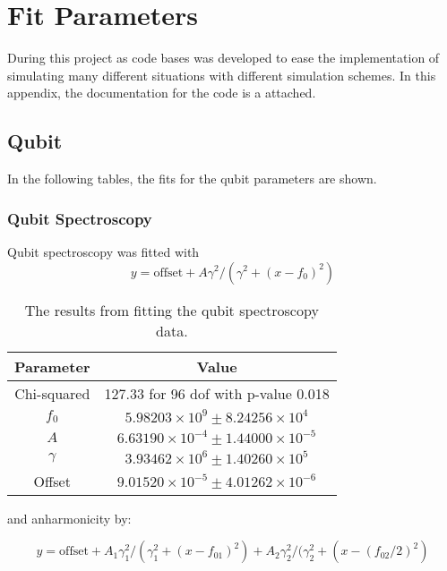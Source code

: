 \chapter{Fit Parameters}\label{chap:fit_params}
During this project as code bases was developed to ease the implementation of simulating many different situations with different simulation schemes. In this appendix, the documentation for the code is a attached.


\section{Qubit}
In the following tables, the fits for the qubit parameters are shown.
\subsection{Qubit Spectroscopy}
Qubit spectroscopy was fitted with 
\begin{equation}
    y = \text{offset} + A\gamma^2/(\gamma^2 + (x - f_0)^2)
\end{equation}
\begin{table}[h]
\centering
\begin{tabular}{|c|c|}
\hline
Parameter & Value \\
\hline
Chi-squared & 127.33 for 96 dof with p-value 0.018 \\
$f_0$ & $5.98203 \times 10^9 \pm 8.24256 \times 10^4$ \\
$A$ & $6.63190 \times 10^{-4} \pm 1.44000 \times 10^{-5}$ \\
$\gamma$ & $3.93462 \times 10^6 \pm 1.40260 \times 10^5$ \\
Offset & $9.01520 \times 10^{-5} \pm 4.01262 \times 10^{-6}$ \\
\hline
\end{tabular}
\caption{The results from fitting the qubit spectroscopy data.}
\label{tab:fit_outcomes_third}
\end{table}
\FloatBarrier
and anharmonicity by:
\begin{fullwidth}
\begin{equation}
    y = \text{offset} + A_1\gamma_1^2/(\gamma_1^2 + (x - f_{01})^2) + A_2\gamma_2^2/(\gamma_2^2 + (x - (f_{02} / 2)^2) 
\end{equation}
\end{fullwidth}


